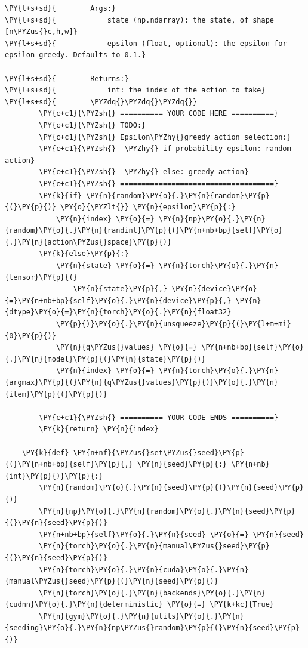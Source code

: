 \documentclass{article}
\begin{document}
\begin{Verbatim}[commandchars=\\\{\}]
\PY{l+s+sd}{        Args:}
\PY{l+s+sd}{            state (np.ndarray): the state, of shape [n\PYZus{}c,h,w]}
\PY{l+s+sd}{            epsilon (float, optional): the epsilon for epsilon greedy. Defaults to 0.1.}

\PY{l+s+sd}{        Returns:}
\PY{l+s+sd}{            int: the index of the action to take}
\PY{l+s+sd}{        \PYZdq{}\PYZdq{}\PYZdq{}}
        \PY{c+c1}{\PYZsh{} ========== YOUR CODE HERE ==========}
        \PY{c+c1}{\PYZsh{} TODO:}
        \PY{c+c1}{\PYZsh{} Epsilon\PYZhy{}greedy action selection:}
        \PY{c+c1}{\PYZsh{}  \PYZhy{} if probability epsilon: random action}
        \PY{c+c1}{\PYZsh{}  \PYZhy{} else: greedy action}
        \PY{c+c1}{\PYZsh{} ====================================}
        \PY{k}{if} \PY{n}{random}\PY{o}{.}\PY{n}{random}\PY{p}{(}\PY{p}{)} \PY{o}{\PYZlt{}} \PY{n}{epsilon}\PY{p}{:}
            \PY{n}{index} \PY{o}{=} \PY{n}{np}\PY{o}{.}\PY{n}{random}\PY{o}{.}\PY{n}{randint}\PY{p}{(}\PY{n+nb+bp}{self}\PY{o}{.}\PY{n}{action\PYZus{}space}\PY{p}{)}
        \PY{k}{else}\PY{p}{:}
            \PY{n}{state} \PY{o}{=} \PY{n}{torch}\PY{o}{.}\PY{n}{tensor}\PY{p}{(}
                \PY{n}{state}\PY{p}{,} \PY{n}{device}\PY{o}{=}\PY{n+nb+bp}{self}\PY{o}{.}\PY{n}{device}\PY{p}{,} \PY{n}{dtype}\PY{o}{=}\PY{n}{torch}\PY{o}{.}\PY{n}{float32}
            \PY{p}{)}\PY{o}{.}\PY{n}{unsqueeze}\PY{p}{(}\PY{l+m+mi}{0}\PY{p}{)}
            \PY{n}{q\PYZus{}values} \PY{o}{=} \PY{n+nb+bp}{self}\PY{o}{.}\PY{n}{model}\PY{p}{(}\PY{n}{state}\PY{p}{)}
            \PY{n}{index} \PY{o}{=} \PY{n}{torch}\PY{o}{.}\PY{n}{argmax}\PY{p}{(}\PY{n}{q\PYZus{}values}\PY{p}{)}\PY{o}{.}\PY{n}{item}\PY{p}{(}\PY{p}{)}

        \PY{c+c1}{\PYZsh{} ========== YOUR CODE ENDS ==========}
        \PY{k}{return} \PY{n}{index}

    \PY{k}{def} \PY{n+nf}{\PYZus{}set\PYZus{}seed}\PY{p}{(}\PY{n+nb+bp}{self}\PY{p}{,} \PY{n}{seed}\PY{p}{:} \PY{n+nb}{int}\PY{p}{)}\PY{p}{:}
        \PY{n}{random}\PY{o}{.}\PY{n}{seed}\PY{p}{(}\PY{n}{seed}\PY{p}{)}
        \PY{n}{np}\PY{o}{.}\PY{n}{random}\PY{o}{.}\PY{n}{seed}\PY{p}{(}\PY{n}{seed}\PY{p}{)}
        \PY{n+nb+bp}{self}\PY{o}{.}\PY{n}{seed} \PY{o}{=} \PY{n}{seed}
        \PY{n}{torch}\PY{o}{.}\PY{n}{manual\PYZus{}seed}\PY{p}{(}\PY{n}{seed}\PY{p}{)}
        \PY{n}{torch}\PY{o}{.}\PY{n}{cuda}\PY{o}{.}\PY{n}{manual\PYZus{}seed}\PY{p}{(}\PY{n}{seed}\PY{p}{)}
        \PY{n}{torch}\PY{o}{.}\PY{n}{backends}\PY{o}{.}\PY{n}{cudnn}\PY{o}{.}\PY{n}{deterministic} \PY{o}{=} \PY{k+kc}{True}
        \PY{n}{gym}\PY{o}{.}\PY{n}{utils}\PY{o}{.}\PY{n}{seeding}\PY{o}{.}\PY{n}{np\PYZus{}random}\PY{p}{(}\PY{n}{seed}\PY{p}{)}


\end{Verbatim}
\end{document}
